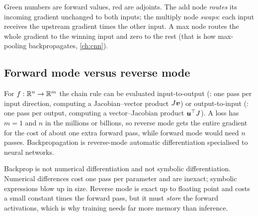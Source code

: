 \begin{center}
\end{center}
Green numbers are forward values, red are adjoints. The add node \emph{routes} its
incoming gradient unchanged to both inputs; the multiply node \emph{swaps}: each input
receives the upstream gradient times the other input. A max node routes the whole
gradient to the winning input and zero to the rest (that is how max-pooling
backpropagates, \cref{ch:cnn}).

\subsection{Forward mode versus reverse mode}
For $f:\mathbb R^n\to\mathbb R^m$ the chain rule can be evaluated input-to-output
(: one pass per input direction, computing a Jacobian--vector
product $J{\bm{v}}$) or output-to-input (: one pass per output,
computing a vector--Jacobian product ${\bm{u}}^{\top} J$). A loss has $m=1$ and $n$ in the
millions or billions, so reverse mode gets the entire gradient for the cost of about one
extra forward pass, while forward mode would need $n$ passes. Backpropagation is
reverse-mode automatic differentiation specialised to neural networks.

\begin{remark}
	\trap Backprop is not numerical differentiation and not symbolic
	differentiation. Numerical differences cost one pass per parameter and are
	inexact; symbolic expressions blow up in size. Reverse mode is exact up to floating
	point and costs a small constant times the forward pass, but it must
	\emph{store} the forward activations, which is why training needs far more memory
	than inference.
\end{remark}

